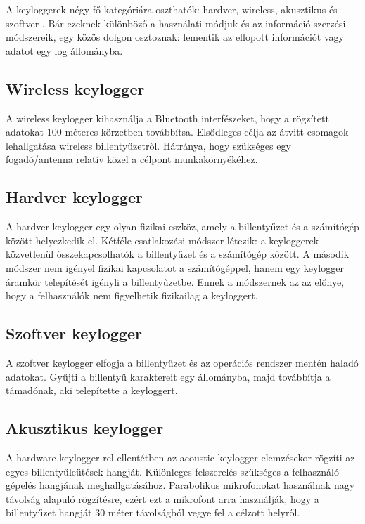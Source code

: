 \documentclass[12pt,a4paper,oneside]{report}
\begin{document}
A keyloggerek négy fő kategóriára oszthatók: hardver, wireless, akusztikus és szoftver \cite{ahmed2014survey}. Bár ezeknek különböző a használati módjuk és az információ szerzési módszereik, egy közös dolgon osztoznak: lementik az ellopott információt vagy adatot egy log állományba.

\subsection{Wireless keylogger}
A wireless keylogger kihasználja a Bluetooth interfészeket, hogy a rögzített adatokat 100 méteres körzetben továbbítsa. Elsődleges célja az átvitt csomagok lehallgatása wireless billentyűzetről. Hátránya, hogy szükséges egy fogadó/antenna relatív közel a célpont munkakörnyékéhez.

\subsection{Hardver keylogger}
A hardver keylogger egy olyan fizikai eszköz, amely a billentyűzet és a számítógép között helyezkedik el. Kétféle csatlakozási módszer létezik: a keyloggerek közvetlenül összekapcsolhatók a billentyűzet és a számítógép között. A második módszer nem igényel fizikai kapcsolatot a számítógéppel, hanem egy keylogger áramkör telepítését igényli a billentyűzetbe. Ennek a módszernek az az előnye, hogy a felhasználók nem figyelhetik fizikailag a keyloggert.

\subsection{Szoftver keylogger}
A szoftver keylogger elfogja a billentyűzet és az operációs rendszer mentén haladó adatokat. Gyűjti a billentyű karaktereit egy állományba, majd továbbítja a támadónak, aki telepítette a keyloggert.

\subsection{Akusztikus keylogger}
A hardware keylogger-rel ellentétben az acoustic keylogger elemzésekor rögzíti az egyes billentyűleütések hangját. Különleges felszerelés szükséges a felhasználó gépelés hangjának meghallgatásához. Parabolikus mikrofonokat használnak nagy távolság alapuló rögzítésre, ezért ezt a mikrofont arra használják, hogy a billentyűzet hangját 30 méter távolságból vegye fel a célzott helyről.
\end{document}
